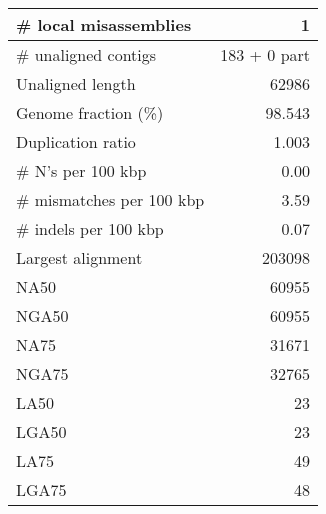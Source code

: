 \documentclass[12pt,a4paper]{article}
\begin{document}
\begin{table}[ht]
\begin{center}
\begin{tabular}{|l*{1}{|r}|}
\# local misassemblies & 1 \\ \hline
\# unaligned contigs & 183 + 0 part \\ \hline
Unaligned length & 62986 \\ \hline
Genome fraction (\%) & 98.543 \\ \hline
Duplication ratio & 1.003 \\ \hline
\# N's per 100 kbp & 0.00 \\ \hline
\# mismatches per 100 kbp & 3.59 \\ \hline
\# indels per 100 kbp & 0.07 \\ \hline
Largest alignment & 203098 \\ \hline
NA50 & 60955 \\ \hline
NGA50 & 60955 \\ \hline
NA75 & 31671 \\ \hline
NGA75 & 32765 \\ \hline
LA50 & 23 \\ \hline
LGA50 & 23 \\ \hline
LA75 & 49 \\ \hline
LGA75 & 48 \\ \hline
\end{tabular}
\end{center}
\end{table}
\end{document}
